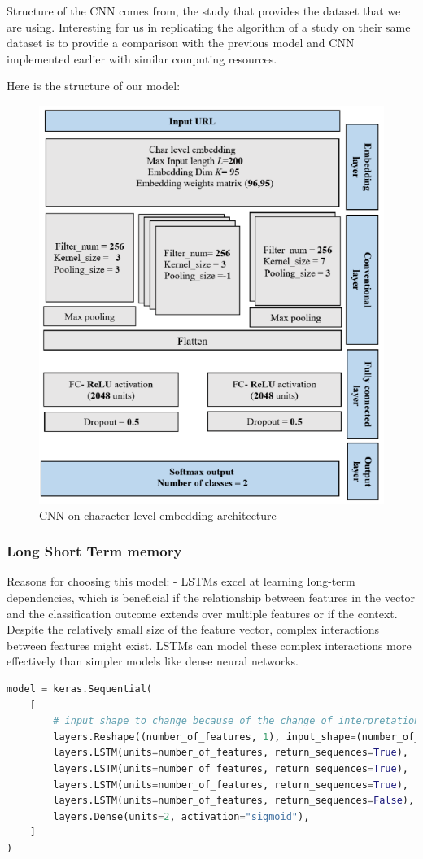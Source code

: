 \documentclass{article}
\begin{document}
    Structure of the CNN comes from\cite{CharacterLevelCNN}, the study that provides the dataset that we are using.
    Interesting for us in replicating the algorithm of a study on their same dataset is to provide a comparison with the previous model and CNN implemented earlier with similar computing resources.

    Here is the structure of our model:
    \begin{figure}[H]
        \centering
        \includegraphics[width=0.8\linewidth]{report_img/cnn_configuration}
        \caption{CNN on character level embedding architecture}
        \label{fig:CNN}
    \end{figure}

    \subsubsection{Long Short Term memory}
    Reasons for choosing this model:
    - LSTMs excel at learning long-term dependencies, which is beneficial if the relationship between features in the vector and the classification outcome extends over multiple features or if the context.
    Despite the relatively small size of the feature vector, complex interactions between features might exist.
    LSTMs can model these complex interactions more effectively than simpler models like dense neural networks.


    \begin{lstlisting}[language=Python, caption=LSTM on feature vector architecture]
model = keras.Sequential(
    [
        # input shape to change because of the change of interpretation of the features
        layers.Reshape((number_of_features, 1), input_shape=(number_of_features,)),
        layers.LSTM(units=number_of_features, return_sequences=True),
        layers.LSTM(units=number_of_features, return_sequences=True),
        layers.LSTM(units=number_of_features, return_sequences=True),
        layers.LSTM(units=number_of_features, return_sequences=False),
        layers.Dense(units=2, activation="sigmoid"),
    ]
)
    \end{lstlisting}
\end{document}
